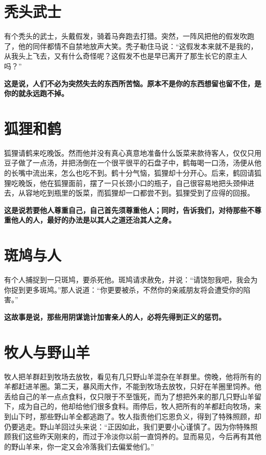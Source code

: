 \section{秃头武士}

有个秃头的武士，头戴假发，骑着马奔跑去打猎。突然，一阵风把他的假发吹跑了，他的同伴都情不自禁地放声大笑。秃子勒住马说：“这假发本来就不是我的，从我头上飞去，又有什么奇怪呢？这假发不也是早已离开了那生长它的原主人吗？”

{\bfseries \color{red}这是说，人们不必为突然失去的东西所苦恼。原本不是你的东西想留也留不住，是你的就永远跑不掉。}

\section{狐狸和鹤}

狐狸请鹤来吃晚饭。然而他并没有真心真意地准备什么饭菜来款待客人，仅仅只用豆子做了一点汤，并把汤倒在一个很平很平的石盘子中，鹤每喝一口汤，汤便从他的长嘴中流出来，怎么也吃不到。鹤十分气恼，狐狸却十分开心。后来，鹤回请狐狸吃晚饭，他在狐狸面前，摆了一只长颈小口的瓶子，自己很容易地把头颈伸进去，从容地吃到瓶里的饭菜，而狐狸却一口都尝不到。狐狸受到了应得的回报。

{\bfseries \color{red}这是说若要他人尊重自己，自己首先须尊重他人；同时，告诉我们，对待那些不尊重他人的人，最好的办法是以其人之道还治其人之身。}

\section{斑鸠与人}

有个人捕捉到一只斑鸠，要杀死他。斑鸠请求赦免，并说：“请饶恕我吧，我会为你捉到更多斑鸠。”那人说道：“你更要被杀，不然你的亲戚朋友将会遭受你的陷害。”

{\bfseries \color{red}这故事是说，那些用阴谋诡计加害亲人的人，必将先得到正义的惩罚。}

\section{牧人与野山羊}

牧人把羊群赶到牧场去放牧，看见有几只野山羊混杂在羊群里。傍晚，他将所有的羊都赶进羊圈。第二天，暴风雨大作，不能到牧场去放牧，只好在羊圈里饲养。他丢给自己的羊一点点食料，仅只限于不至饿死，而为了想把外来的那几只野山羊留下，成为自己的，他却给他们很多食料。雨停后，牧人把所有的羊都赶向牧场，来到山下时，那些野山羊全都逃跑了。牧人指责他们忘恩负义，得到了特殊照顾，却仍要逃走。野山羊回过头来说：“正因如此，我们更要小心谨慎了。因为你特殊照顾我们这些昨天刚来的，而过于冷淡你以前一直饲养的。显而易见，今后再有其他的野山羊来，你一定又会冷落我们去偏爱他们。”

